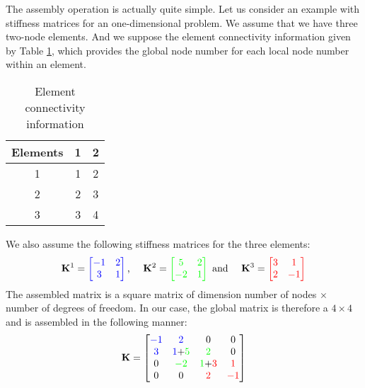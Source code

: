 The assembly operation is actually quite simple. Let us consider an example with stiffness matrices for an one-dimensional problem. We assume that we have three two-node elements. And we suppose the element connectivity information given by Table \ref{chap3:connectivity}, which provides the global node number for each local node number within an element. 
%
\begin{table}[ht]
	\begin{center}
	\begin{tabular}{|c|c|c|}
		\hline Elements & 1 & 2 \\ 
		\hline 1 & 1 & 2 \\ 
		\hline 2 & 2 & 3 \\ 
		\hline 3 & 3 & 4 \\ 
		\hline 
		\end{tabular} \caption{Element connectivity information}
		\label{chap3:connectivity}
	\end{center}
\end{table}
%
We also assume the following stiffness matrices for the three elements:
\begin{equation}
\mathbf{K}^1 = 
\color{blue}
	\begin{bmatrix}
	-1 & 2 \\
	3 & 1
	\end{bmatrix}
\color{black}
\text{, } \quad 
\mathbf{K}^2 = 
\color{green}
	\begin{bmatrix}
	5 & 2 \\
	-2 & 1
	\end{bmatrix}
\color{black}
\text{ and } \quad 
\mathbf{K}^3 = 
\color{red}
	\begin{bmatrix}
	3 & 1 \\
	2 & -1
	\end{bmatrix}
\color{black}
\end{equation}
The assembled matrix is a square matrix of dimension number of nodes $\times$ number of degrees of freedom. In our case, the global matrix is therefore a $ 4 \times 4 $ and is assembled in the following manner:
\begin{equation}
\mathbf{K} = 
	\begin{bmatrix}
	\color{blue}{-1} & \color{blue}{2} & \color{black}{0} & 0 \\
	\color{blue}{3} & \color{blue}{1}\color{black}{+}\color{green}{5} & \color{green}{2} & \color{black}{0} \\
	0 & \color{green}{-2} & \color{green}{1} \color{black}{+} \color{red}{3} & \color{red}{1} \\
	\color{black}{0} & 0 & \color{red}{2} & \color{red}{-1}
	\end{bmatrix}
\color{black}
\end{equation}
